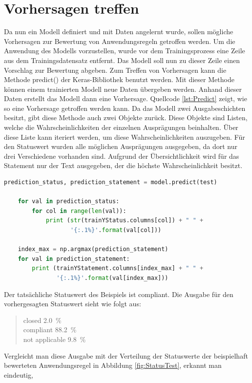 \section{Vorhersagen treffen}
\label{chap:Prediction}

Da nun ein Modell definiert und mit Daten angelernt wurde, sollen mögliche Vorhersagen zur Bewertung von Anwendungsregeln getroffen werden. 
Um die Anwendung des Modells vorzustellen, wurde vor dem Trainingsprozess eine Zeile aus dem Trainingsdatensatz entfernt. 
Das Modell soll nun zu dieser Zeile einen Vorschlag zur Bewertung abgeben. Zum Treffen von Vorhersagen kann 
die Methode predict() der Keras-Bibliothek benutzt werden. Mit dieser Methode können einem trainierten Modell neue Daten übergeben werden.
Anhand dieser Daten erstellt das Modell dann eine Vorhersage. Quellcode \ref*{lst:Predict} zeigt, wie so eine Vorhersage getroffen werden kann.
Da das Modell zwei Ausgabeschichten besitzt, gibt diese Methode auch zwei Objekte zurück. Diese Objekte sind Listen, welche die Wahrscheinlichkeiten
der einzelnen Ausprägungen beinhalten. Über diese Liste kann iteriert werden, um diese Wahrscheinlichkeiten auszugeben. Für den Statuswert 
wurden alle möglichen Ausprägungen ausgegeben, da dort nur drei Verschiedene vorhanden sind. Aufgrund der Übersichtlichkeit wird für das Statement
nur der Text ausgegeben, der die höchste Wahrscheinlichkeit besitzt. 
\begin{lstlisting}[language = python, caption={Vorhersage über neue Daten treffen},captionpos=b, label = lst:Predict, floatplacement=H]
    prediction_status, prediction_statement = model.predict(test)

    for val in prediction_status:
        for col in range(len(val)):
            print (str(trainYStatus.columns[col]) + " " + 
                   '{:.1%}'.format(val[col]))
    
    index_max = np.argmax(prediction_statement)
    for val in prediction_statement:
        print (trainYStatement.columns[index_max] + " " + 
               '{:.1%}'.format(val[index_max]))
\end{lstlisting}
Der tatsächliche Statuswert des Beispiels ist \glqq compliant\grqq{}. Die Ausgabe für den vorhergesagten Statuswert sieht wie folgt aus:
\begin{quotation}
    \noindent closed 2.0~\%\\
    compliant 88.2~\%\\
    not applicable 9.8~\%
\end{quotation}
Vergleicht man diese Ausgabe mit der Verteilung der Statuswerte der beispielhaft bewerteten Anwendungsregel in Abbildung \ref*{fig:StatusTest}, erkannt man eindeutig, 
